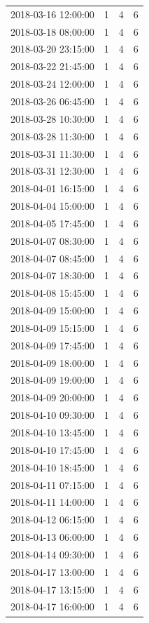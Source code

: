 \begin{tabular}{lrrr}
2018-03-16 12:00:00 & 1 & 4 & 6 \\
2018-03-18 08:00:00 & 1 & 4 & 6 \\
2018-03-20 23:15:00 & 1 & 4 & 6 \\
2018-03-22 21:45:00 & 1 & 4 & 6 \\
2018-03-24 12:00:00 & 1 & 4 & 6 \\
2018-03-26 06:45:00 & 1 & 4 & 6 \\
2018-03-28 10:30:00 & 1 & 4 & 6 \\
2018-03-28 11:30:00 & 1 & 4 & 6 \\
2018-03-31 11:30:00 & 1 & 4 & 6 \\
2018-03-31 12:30:00 & 1 & 4 & 6 \\
2018-04-01 16:15:00 & 1 & 4 & 6 \\
2018-04-04 15:00:00 & 1 & 4 & 6 \\
2018-04-05 17:45:00 & 1 & 4 & 6 \\
2018-04-07 08:30:00 & 1 & 4 & 6 \\
2018-04-07 08:45:00 & 1 & 4 & 6 \\
2018-04-07 18:30:00 & 1 & 4 & 6 \\
2018-04-08 15:45:00 & 1 & 4 & 6 \\
2018-04-09 15:00:00 & 1 & 4 & 6 \\
2018-04-09 15:15:00 & 1 & 4 & 6 \\
2018-04-09 17:45:00 & 1 & 4 & 6 \\
2018-04-09 18:00:00 & 1 & 4 & 6 \\
2018-04-09 19:00:00 & 1 & 4 & 6 \\
2018-04-09 20:00:00 & 1 & 4 & 6 \\
2018-04-10 09:30:00 & 1 & 4 & 6 \\
2018-04-10 13:45:00 & 1 & 4 & 6 \\
2018-04-10 17:45:00 & 1 & 4 & 6 \\
2018-04-10 18:45:00 & 1 & 4 & 6 \\
2018-04-11 07:15:00 & 1 & 4 & 6 \\
2018-04-11 14:00:00 & 1 & 4 & 6 \\
2018-04-12 06:15:00 & 1 & 4 & 6 \\
2018-04-13 06:00:00 & 1 & 4 & 6 \\
2018-04-14 09:30:00 & 1 & 4 & 6 \\
2018-04-17 13:00:00 & 1 & 4 & 6 \\
2018-04-17 13:15:00 & 1 & 4 & 6 \\
2018-04-17 16:00:00 & 1 & 4 & 6 \\

\end{tabular}
